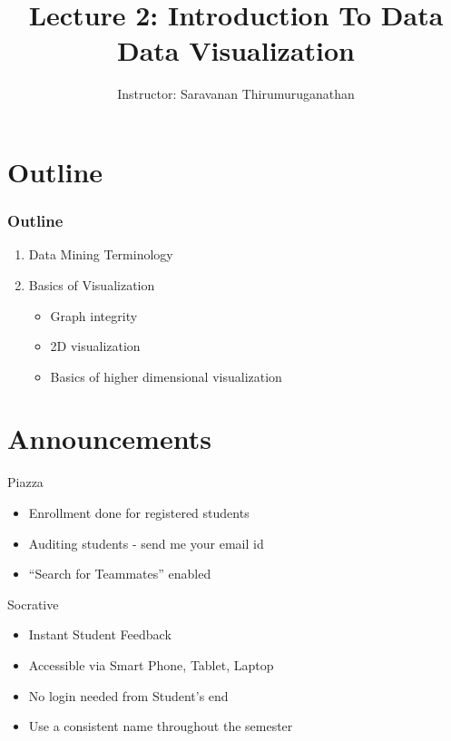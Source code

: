 \documentclass{beamer}
\title[Saravanan Thirumuruganathan] 
{Lecture 2: Introduction To Data Data Visualization}
\author[CSE 5334] 
{Instructor: Saravanan Thirumuruganathan}
\date[]
\begin{document}
\begin{frame}
  \titlepage
\end{frame}


\section{Outline}

\begin{frame}
\frametitle {Outline}
\begin{enumerate}
\item Data Mining Terminology
\item Basics of Visualization
    \begin{itemize}
        \item Graph integrity
        \item 2D visualization
        \item Basics of higher dimensional visualization
    \end{itemize}
\end{enumerate}
\end{frame}


\section{Announcements}
\begin{frame}{Piazza}                                                                                              
    \begin{itemize}                                                                                                          
        \item Enrollment done for registered students
        \item Auditing students - send me your email id
        \item ``Search for Teammates'' enabled
    \end{itemize}                                                                                                            
\end{frame}   

\begin{frame}{Socrative}                                                                                              
    \begin{itemize}                                                                                                          
        \item Instant Student Feedback
        \item Accessible via Smart Phone, Tablet, Laptop
        \item No login needed from Student's end
        \item Use a consistent name throughout the semester
    \end{itemize}                                                                                                            
\end{frame}   
\end{document}
